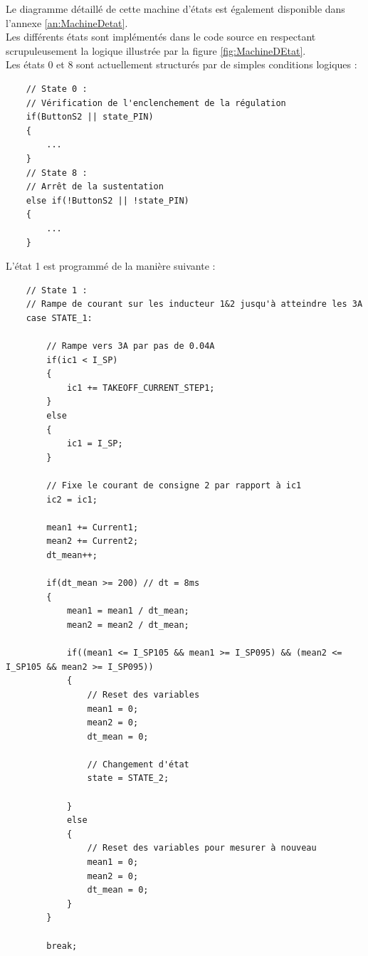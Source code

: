 Le diagramme détaillé de cette machine d'états est également disponible dans l'annexe \ref{an:MachineDetat}.\\

Les différents états sont implémentés dans le code source en respectant scrupuleusement la logique illustrée par la figure \ref{fig:MachineDEtat}.\\

Les états 0 et 8 sont actuellement structurés par de simples conditions logiques :

\begin{verbatim}
    // State 0 :
    // Vérification de l'enclenchement de la régulation
    if(ButtonS2 || state_PIN)
    {
        ...
    }
    // State 8 :
    // Arrêt de la sustentation
    else if(!ButtonS2 || !state_PIN)
    {
        ...
    }
\end{verbatim}

L'état 1 est programmé de la manière suivante :

\begin{verbatim}
    // State 1 :
    // Rampe de courant sur les inducteur 1&2 jusqu'à atteindre les 3A
    case STATE_1:

        // Rampe vers 3A par pas de 0.04A
        if(ic1 < I_SP)
        {
            ic1 += TAKEOFF_CURRENT_STEP1;
        }
        else
        {
            ic1 = I_SP;
        }

        // Fixe le courant de consigne 2 par rapport à ic1
        ic2 = ic1;

        mean1 += Current1;
        mean2 += Current2;
        dt_mean++;

        if(dt_mean >= 200) // dt = 8ms
        {
            mean1 = mean1 / dt_mean;
            mean2 = mean2 / dt_mean;

            if((mean1 <= I_SP105 && mean1 >= I_SP095) && (mean2 <= I_SP105 && mean2 >= I_SP095))
            {
                // Reset des variables
                mean1 = 0;
                mean2 = 0;
                dt_mean = 0;

                // Changement d'état
                state = STATE_2;

            }
            else
            {
                // Reset des variables pour mesurer à nouveau
                mean1 = 0;
                mean2 = 0;
                dt_mean = 0;
            }
        }

        break;
\end{verbatim}

